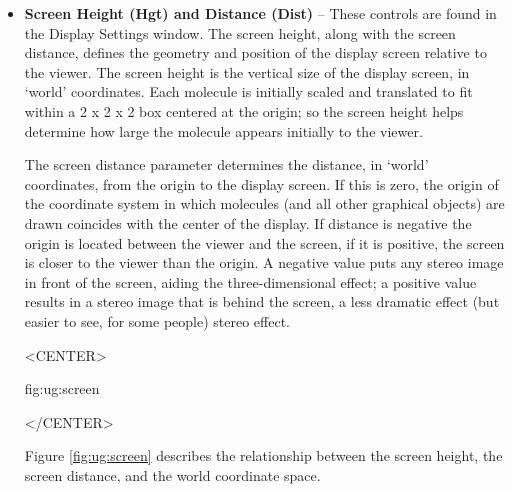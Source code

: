 \begin{itemize}
\item {\bf Screen Height (Hgt) and Distance (Dist)} --
\label{ug:ui:window:screen_size}
These controls are found in the {\sf Display Settings} window.
The screen height, along with the screen distance, defines the geometry
and position of the display screen relative to the viewer.  The screen
height is the vertical size of the display screen, in `world' coordinates.
Each molecule is initially scaled and translated to fit within a 2 x 2 x 2
box centered at the origin; so the screen height helps determine how large
the molecule appears initially to the viewer.  

The screen distance parameter determines the distance, in `world' coordinates, 
from the origin to the display screen.  If this is zero, the origin of the
coordinate system in which molecules (and all other graphical objects) are
drawn coincides with the center of the display.  If distance is negative
the origin is located between the viewer and the screen, if it is 
positive, the screen is closer to the viewer than the origin.
A negative value puts any stereo image in front of the screen, aiding the
three-dimensional effect; a positive value results in a stereo image that is
behind the screen, a less dramatic effect (but easier to see, for some
people) stereo effect.

\begin{rawhtml}
<CENTER>
\end{rawhtml}
{fig:ug:screen}
\begin{rawhtml}
</CENTER>
\end{rawhtml}

Figure \ref{fig:ug:screen} describes the relationship between the screen
height, the screen distance, and the world coordinate space.

\end{itemize}

